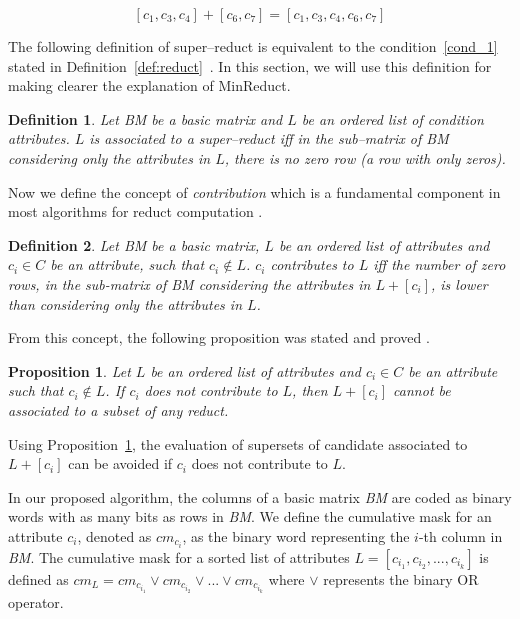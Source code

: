 \documentclass[authoryear,preprint,review,12pt]{elsarticle}
\newtheorem{proposition}{Proposition}
\newtheorem{definition}{Definition}
\begin{document}
	$$[c_1,c_3,c_4]+[c_6,c_7]=[c_1,c_3,c_4,c_6,c_7]$$
	
	The following definition of super--reduct is equivalent to the condition~\ref{cond_1} stated in Definition~\ref{def:reduct}~\citep{Lazo15}. In this section, we will use this definition for making clearer the explanation of MinReduct.
		
	\begin{definition}\label{def:testor}
		Let BM be a basic matrix and $L$ be an ordered list of condition attributes. $L$ is associated to a super--reduct iff in the sub--matrix of BM considering only the attributes in $L$, there is no zero row (a row with only zeros).
	\end{definition}
		
	Now we define the concept of \textit{contribution} which is a fundamental component in most algorithms for reduct computation \citep{Sanchez07,WangP07,Lias09, Rodriguez2018}. 
			
	\begin{definition}\label{def:contrib}
		Let BM be a basic matrix, $L$ be an ordered list of attributes and $c_i \in C$ be an attribute, such that $c_i \notin L$. $c_i$ contributes to $L$ iff the number of zero rows, in the sub-matrix of BM considering the attributes in $L+[c_i]$, is lower than considering only the attributes in $L$.
	\end{definition}
			
	From this concept, the following proposition was stated and proved \citep{Sanchez07}.
			
	\begin{proposition}\label{prop:contrib} 
		Let $L$ be an ordered list of attributes and $c_i \in C$ be an attribute such that $c_i \notin L$. If $c_i$ does not contribute to $L$, then $L+[c_i]$ cannot be associated to a subset of any reduct.
	\end{proposition}
	
	Using Proposition~\ref{prop:contrib}, the evaluation of supersets of candidate associated to $L+[c_i]$ can be avoided if $c_i$ does not contribute to $L$.
	
	In our proposed algorithm, the columns of a basic matrix \textit{BM} are coded as binary words with as many bits as rows in \textit{BM}. We define the cumulative mask for an attribute $c_i$, denoted as $cm_{c_i}$, as the binary word representing the $i$-th column in \textit{BM}. The cumulative mask for a sorted list of attributes $L=[c_{i_1},c_{i_2},...,c_{i_k}]$ is defined	as $cm_L = cm_{c_{i_1}} \vee cm_{c_{i_2}} \vee ... \vee cm_{c_{i_k}}$ where $\vee$ represents the binary OR operator.
	
\end{document}
